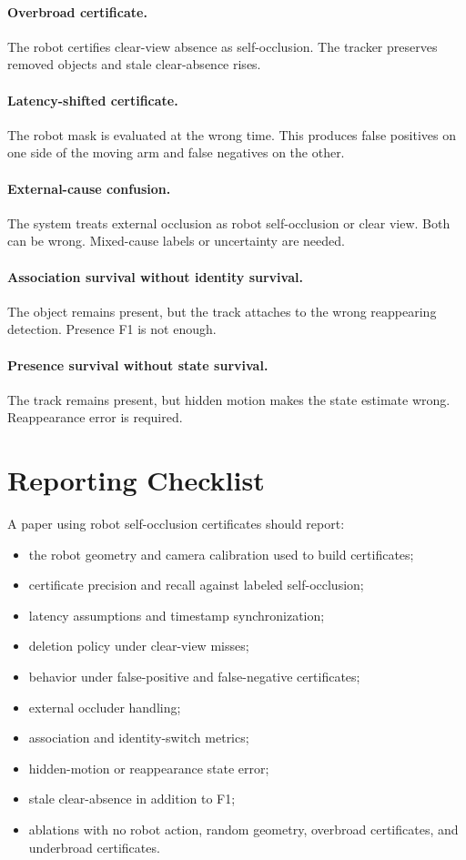 \documentclass{article}
\begin{document}
\paragraph{Overbroad certificate.}
The robot certifies clear-view absence as self-occlusion. The tracker preserves
removed objects and stale clear-absence rises.

\paragraph{Latency-shifted certificate.}
The robot mask is evaluated at the wrong time. This produces false positives on
one side of the moving arm and false negatives on the other.

\paragraph{External-cause confusion.}
The system treats external occlusion as robot self-occlusion or clear view.
Both can be wrong. Mixed-cause labels or uncertainty are needed.

\paragraph{Association survival without identity survival.}
The object remains present, but the track attaches to the wrong reappearing
detection. Presence F1 is not enough.

\paragraph{Presence survival without state survival.}
The track remains present, but hidden motion makes the state estimate wrong.
Reappearance error is required.

\section{Reporting Checklist}

A paper using robot self-occlusion certificates should report:
\begin{itemize}[leftmargin=*]
\item the robot geometry and camera calibration used to build certificates;
\item certificate precision and recall against labeled self-occlusion;
\item latency assumptions and timestamp synchronization;
\item deletion policy under clear-view misses;
\item behavior under false-positive and false-negative certificates;
\item external occluder handling;
\item association and identity-switch metrics;
\item hidden-motion or reappearance state error;
\item stale clear-absence in addition to F1;
\item ablations with no robot action, random geometry, overbroad certificates,
and underbroad certificates.
\end{itemize}
\end{document}
